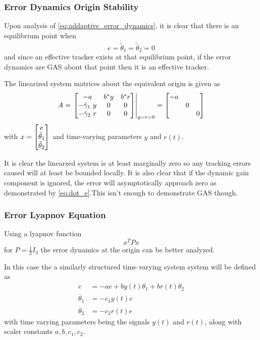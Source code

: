 \documentclass[letter]{article}
\begin{document}
\subsubsection{Error Dynamics Origin Stability}
Upon analysis of \eqref{eq:addaptive_error_dynamics}, it is clear that there is an equilibrium point when $$e = \dot{\tilde{\theta}}_1 = \dot{\tilde{\theta}}_2 = 0$$ and since an effective tracker exists at that equilibrium point, if the error dynamics are GAS about that point then it is an effective tracker.

The linearized system matrices about the equivalent origin is given as
\begin{equation}
	\begin{aligned}
		A &= \eval{\mqty[-a &b^* y &b^* r\\
				  - \tilde{\gamma}_1 \ y & 0 &0\\
				  - \tilde{\gamma}_2 \ r & 0 & 0]
			  	  }_{y=r=0}
		   = \mqty[-a & &\\&0&\\&&0]\\
	\end{aligned}
\end{equation}
with $x = \mqty[e\\ \tilde{\theta}_1 \\ \tilde{\theta}_2]$ and time-varying parameters $y$ and $r(t)$.

It is clear the linearzed system is at least marginally zero so any tracking errors caused will at least be bounded locally. It is also clear that if the dynamic gain component is ignored, the error will asymptotically approach zero as demonstrated by \eqref{eq:dot_e}.This isn't enough to demonstrate GAS though.


\subsubsection{Error Lyapnov Equation}
Using a lyapnov function $$x^T P x$$ for $P = \frac{1}{2} I_3$ the error dynamics at the origin can be better analyzed.

In this case the a similarly structured time varying system system will be defined as
\begin{equation}
	\begin{aligned}
		\dot{e} 
		&= -a e + b y(t) \theta_1 + b r(t) \theta_2\\
		\dot{\theta_1}	&= - c_1 y(t) e\\
		\dot{\theta_2}	&= - c_2 r(t) e
	\end{aligned}
\end{equation}
with time varying parameters being the signals $y(t)$ and $r(t)$, along with scaler constants $a, b, c_1, c_2$.
\end{document}
